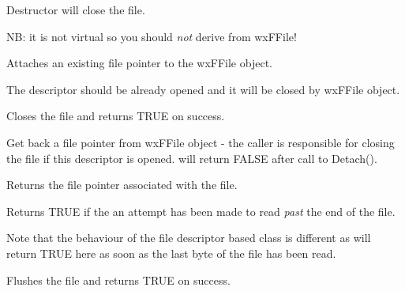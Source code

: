 


Destructor will close the file.

NB: it is not virtual so you should {\it not} derive from wxFFile!

\label{wxffileattach}


Attaches an existing file pointer to the wxFFile object.

The descriptor should be already opened and it will be closed by wxFFile
object.

\label{wxffileclose}


Closes the file and returns TRUE on success.

\label{wxffiledetach}


Get back a file pointer from wxFFile object - the caller is responsible for closing the file if this
descriptor is opened.  will return FALSE after call to Detach().

\label{wxffilefp}


Returns the file pointer associated with the file.

\label{wxffileeof}


Returns TRUE if the an attempt has been made to read {\it past}
the end of the file. 

Note that the behaviour of the file descriptor based class
 is different as 
will return TRUE here as soon as the last byte of the file has been
read.

\label{wxffileflush}


Flushes the file and returns TRUE on success.

\label{wxffileisopened}

